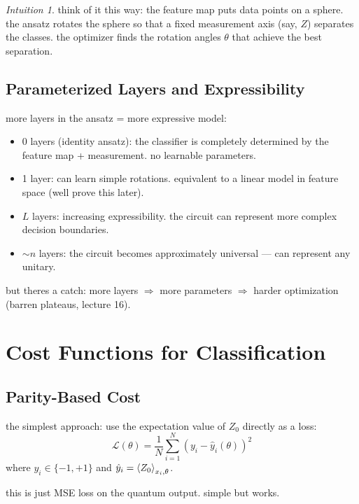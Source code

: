 \documentclass[11pt,a4paper]{article}
\theoremstyle{definition}
\theoremstyle{remark}
\newtheorem*{intuition}{Intuition}
\begin{document}
\begin{intuition}
think of it this way: the feature map puts data points on a sphere. the ansatz rotates the sphere so that a fixed measurement axis (say, $Z$) separates the classes. the optimizer finds the rotation angles $\theta$ that achieve the best separation.
\end{intuition}

\subsection{Parameterized Layers and Expressibility}

more layers in the ansatz = more expressive model:
\begin{itemize}
    \item 0 layers (identity ansatz): the classifier is completely determined by the feature map + measurement. no learnable parameters.
    \item 1 layer: can learn simple rotations. equivalent to a linear model in feature space (well prove this later).
    \item $L$ layers: increasing expressibility. the circuit can represent more complex decision boundaries.
    \item $\sim n$ layers: the circuit becomes approximately universal --- can represent any unitary.
\end{itemize}

but theres a catch: more layers $\Rightarrow$ more parameters $\Rightarrow$ harder optimization (barren plateaus, lecture 16).

\section{Cost Functions for Classification}

\subsection{Parity-Based Cost}

the simplest approach: use the expectation value of $Z_0$ directly as a loss:
\[
\mathcal{L}(\theta) = \frac{1}{N}\sum_{i=1}^N (y_i - \hat{y}_i(\theta))^2
\]
where $y_i \in \{-1, +1\}$ and $\hat{y}_i = \braket{Z_0}_{x_i, \theta}$.

this is just MSE loss on the quantum output. simple but works.
\end{document}
